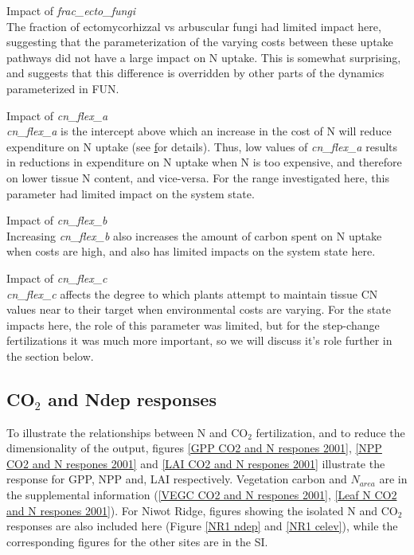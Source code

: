 \documentclass[draft,linenumbers]{agujournal}
\begin{document}
Impact of \emph{frac\_ecto\_fungi}\\
The fraction of ectomycorhizzal vs arbuscular fungi had limited impact here, suggesting that the parameterization of the varying costs between these uptake pathways did not have a large impact on N uptake. This is somewhat surprising, and suggests that this difference is overridden by other parts of the dynamics parameterized in FUN.

Impact of \emph{cn\_flex\_a}\\
\emph{cn\_flex\_a}  is the intercept above which an increase in the cost of N will reduce expenditure on N uptake (see \href{https://escomp.github.io/ctsm-docs/doc/build/html/tech_note/FUN/CLM50_Tech_Note_FUN.html#modifications-to-allow-variation-in-c-n-ratios} for details). Thus, low values of \emph{cn\_flex\_a}  results in reductions in expenditure on N uptake when N is too expensive, and therefore on lower tissue N content, and vice-versa.   For the range investigated here, this parameter had limited impact on the system state. 

Impact of \emph{cn\_flex\_b}\\
Increasing \emph{cn\_flex\_b} also increases the amount of carbon spent on N uptake when costs are high, and also has limited impacts on the system state here.

Impact of \emph{cn\_flex\_c}\\
 \emph{cn\_flex\_c} affects the degree to which plants attempt to maintain tissue CN values near to their target when environmental costs are varying. For the state impacts here, the role of this parameter was limited, but for the step-change fertilizations it was much more important, so we will discuss it's role further in the section below. 

\subsection{CO$_{2}$ and Ndep responses}

To illustrate the relationships between N and CO$_{2}$ fertilization, and to reduce the dimensionality of the output, figures \ref{GPP CO2 and N respones 2001}, \ref{NPP CO2 and N respones 2001} and \ref{LAI CO2 and N respones 2001} illustrate the response for GPP, NPP and, LAI respectively. Vegetation carbon and $N_{area}$ are in the supplemental information (\ref{VEGC CO2 and N respones 2001}, \ref{Leaf N CO2 and N respones 2001}).  For Niwot Ridge, figures showing the isolated N and CO$_{2}$ responses are also included here (Figure \ref{NR1 ndep} and \ref{NR1 celev}), while the corresponding figures for the other sites are in the SI.
\end{document}
